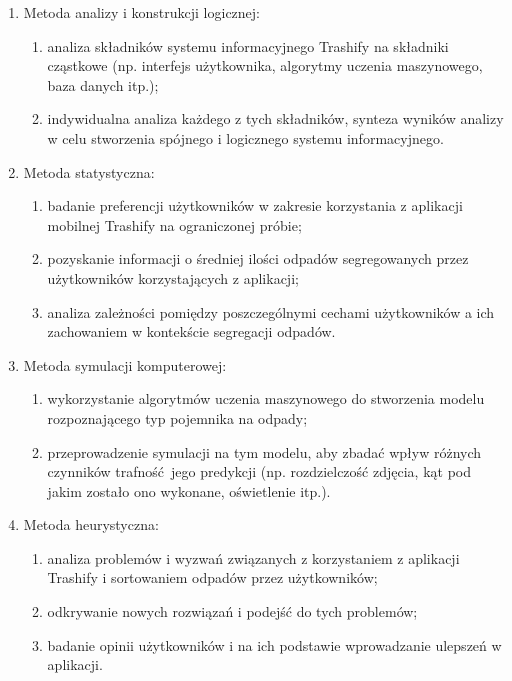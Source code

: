 \documentclass[12pt,oneside]{book}
\begin{document}
\begin{enumerate}
    \item Metoda analizy i konstrukcji logicznej:
    
    \begin{enumerate}[label=--]
        \item analiza składników systemu informacyjnego Trashify na składniki cząstkowe (np. interfejs użytkownika, algorytmy uczenia maszynowego, baza danych itp.);
        \item indywidualna analiza każdego z tych składników,
        synteza wyników analizy w celu stworzenia spójnego i logicznego systemu informacyjnego.
    \end{enumerate}

    \item Metoda statystyczna:
    
    \begin{enumerate}[label=--]
        \item badanie preferencji użytkowników w zakresie korzystania z aplikacji mobilnej Trashify na ograniczonej próbie;
        \item pozyskanie informacji o średniej ilości odpadów segregowanych przez użytkowników korzystających z aplikacji;
        \item analiza zależności pomiędzy poszczególnymi cechami użytkowników a ich zachowaniem w kontekście segregacji odpadów.
    \end{enumerate}

    \item Metoda symulacji komputerowej:
    
    \begin{enumerate}[label=--]
        \item wykorzystanie algorytmów uczenia maszynowego do stworzenia modelu rozpoznającego typ pojemnika na odpady;
        \item przeprowadzenie symulacji na tym modelu, aby zbadać wpływ różnych czynników trafność jego predykcji (np. rozdzielczość zdjęcia, kąt pod jakim zostało ono wykonane, oświetlenie itp.).
    \end{enumerate}

    \item Metoda heurystyczna:
    
       
    \begin{enumerate}[label=--]
        \item analiza problemów i wyzwań związanych z korzystaniem z aplikacji Trashify i sortowaniem odpadów przez użytkowników;
        \item odkrywanie nowych rozwiązań i podejść do tych problemów;
        \item badanie opinii użytkowników i na ich podstawie wprowadzanie ulepszeń w aplikacji.
    \end{enumerate}

\end{enumerate}
\end{document}
